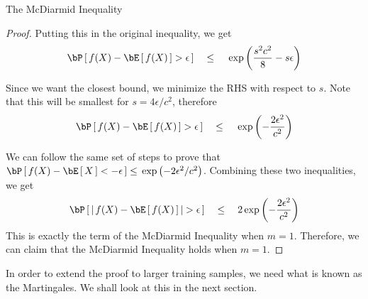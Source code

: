 \documentclass[11pt,a4paper]{article}
\begin{document}
\begin{ssection}{The McDiarmid Inequality}
\begin{proof}
		Putting this in the original inequality, we get
		\begin{align*}
			\prob{f(X) - \E{f(X)} > \epsilon}	\qle	\texp{\frac{s^2 c^2}{8} - s \epsilon} 
		\end{align*}
		
		Since we want the closest bound, we minimize the RHS with respect to $s$. Note that this will be smallest for $s = 4 \epsilon / c^2$, therefore
		\begin{align*}
			\prob{f(X) - \E{f(X)} > \epsilon}	\qle	\texp{-\frac{2 \epsilon^2}{c^2}} 
		\end{align*}
		
		We can follow the same set of steps to prove that $\prob{f(X) - \E{X} < - \epsilon} \le \texp{- 2\epsilon^2 / c^2}$. Combining these two inequalities, we get
		\begin{align*}
			\prob{\abs{f(X) - \E{f(X)}} > \epsilon}	\qle	2 \texp{- \frac{2 \epsilon^2}{c^2}} 
		\end{align*}
		This is exactly the term of the McDiarmid Inequality when $m = 1$. Therefore, we can claim that the McDiarmid Inequality holds when $m = 1$.
	\end{proof}
	
	In order to extend the proof to larger training samples, we need what is known as the Martingales. We shall look at this in the next section.
	
\end{ssection}
\end{document}
